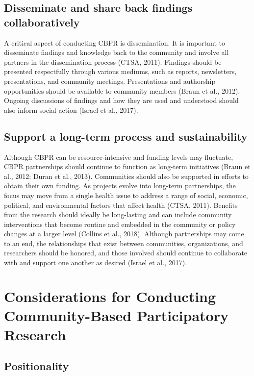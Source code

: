 \documentclass[
  11pt,
]{book}
\begin{document}
\subsection{Disseminate and share back findings collaboratively}\label{disseminate-and-share-back-findings-collaboratively}

A critical aspect of conducting CBPR is dissemination. It is important to disseminate findings and knowledge back to the community and involve all partners in the dissemination process (CTSA, 2011). Findings should be presented respectfully through various mediums, such as reports, newsletters, presentations, and community meetings. Presentations and authorship opportunities should be available to community members (Braun et al., 2012). Ongoing discussions of findings and how they are used and understood should also inform social action (Israel et al., 2017).

\subsection{Support a long-term process and sustainability}\label{support-a-long-term-process-and-sustainability}

Although CBPR can be resource-intensive and funding levels may fluctuate, CBPR partnerships should continue to function as long-term initiatives (Braun et al., 2012; Duran et al., 2013). Communities should also be supported in efforts to obtain their own funding. As projects evolve into long-term partnerships, the focus may move from a single health issue to address a range of social, economic, political, and environmental factors that affect health (CTSA, 2011). Benefits from the research should ideally be long-lasting and can include community interventions that become routine and embedded in the community or policy changes at a larger level (Collins et al., 2018). Although partnerships may come to an end, the relationships that exist between communities, organizations, and researchers should be honored, and those involved should continue to collaborate with and support one another as desired (Israel et al., 2017).

\section{Considerations for Conducting Community-Based Participatory Research}\label{considerations-for-conducting-community-based-participatory-research}

\subsection{Positionality}\label{positionality-1}
\end{document}
